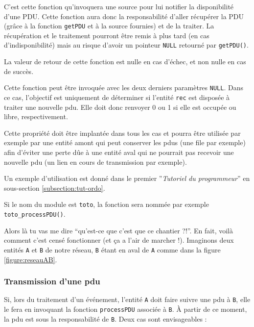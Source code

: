    C'est cette fonction qu'invoquera une source pour lui notifier la
disponibilité d'une PDU. Cette fonction aura donc la responsabilité
d'aller récupérer la PDU (grâce à la fonction \lstinline!getPDU! et à la source
fournies) et de la traiter. La récupération et le traitement pourront
être remis à plus tard (en cas d'indisponibilité) mais au risque
d'avoir un pointeur \lstinline!NULL! retourné par
\lstinline!getPDU()!.

   La valeur de retour de cette fonction est nulle en cas d'échec, et
non nulle en cas de succès.

   Cette fonction peut être invoquée avec les deux derniers paramètres%
{\tt NULL}. Dans ce cas, l'objectif est uniquement de déterminer si
l'entité {\tt rec} est disposée à traiter une nouvelle {\sc pdu}. Elle
doit donc renvoyer 0 ou 1 si elle est occupée ou libre, respectivement. 

   Cette propriété doit être implantée dans tous les cas et pourra
être utilisée par exemple par une entité amont qui peut conserver les
{\sc pdu}s (une file par exemple) afin d'éviter une perte dûe à une
entité aval qui ne pourrait pas recevoir une nouvelle {\sc pdu} (un
lien en cours de  transmission par exemple).

   Un exemple d'utilisation est donné dans le premier ''{\em Tutoriel
     du programmeur}'' en sous-section \ref{subsection:tut-ordo}.

   Si le nom du module est {\tt toto}, la fonction sera nommée par exemple
{\tt toto\_processPDU()}.

   Alors là tu vas me dire ``qu'est-ce que c'est que ce chantier
?!''. En fait, voilà comment c'est censé fonctionner (et ça a l'air
de marcher !). Imaginons deux entités {\tt A} et {\tt B} de notre
réseau, {\tt B} étant en aval de {\tt A} comme dans la figure
\ref{figure:reseauAB}.

%
\subsubsection{Transmission d'une {\sc pdu}}

   Si, lors du traitement d'un événement, l'entité {\tt A} doit faire
suivre une {\sc pdu} à {\tt B}, elle le fera en invoquant la fonction
\lstinline!processPDU! associée à {\tt B}. À partir de ce moment, la
{\sc pdu} est sous la responsabilité de {\tt B}. Deux cas sont
envisageables : 

